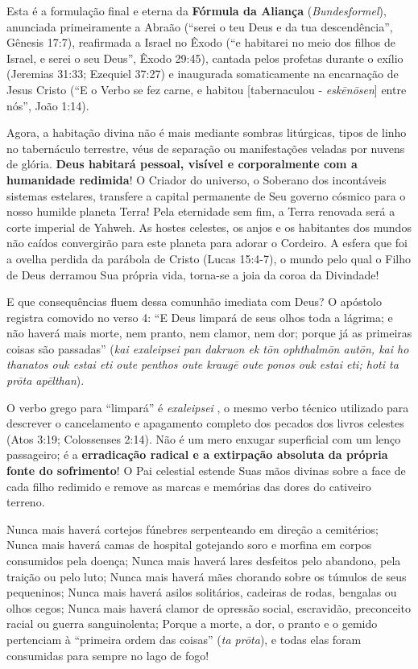 Esta é a formulação final e eterna da \textbf{Fórmula da Aliança} (\textit{Bundesformel}), anunciada primeiramente a Abraão (``serei o teu Deus e da tua descendência'', Gênesis 17:7), reafirmada a Israel no Êxodo (``e habitarei no meio dos filhos de Israel, e serei o seu Deus'', Êxodo 29:45), cantada pelos profetas durante o exílio (Jeremias 31:33; Ezequiel 37:27) e inaugurada somaticamente na encarnação de Jesus Cristo (``E o Verbo se fez carne, e habitou [tabernaculou - \textit{eskēnōsen}] entre nós'', João 1:14).

Agora, a habitação divina não é mais mediante sombras litúrgicas, tipos de linho no tabernáculo terrestre, véus de separação ou manifestações veladas por nuvens de glória. \textbf{Deus habitará pessoal, visível e corporalmente com a humanidade redimida}!
O Criador do universo, o Soberano dos incontáveis sistemas estelares, transfere a capital permanente de Seu governo cósmico para o nosso humilde planeta Terra! Pela eternidade sem fim, a Terra renovada será a corte imperial de Yahweh. As hostes celestes, os anjos e os habitantes dos mundos não caídos convergirão para este planeta para adorar o Cordeiro. A esfera que foi a ovelha perdida da parábola de Cristo (Lucas 15:4-7), o mundo pelo qual o Filho de Deus derramou Sua própria vida, torna-se a joia da coroa da Divindade!

E que consequências fluem dessa comunhão imediata com Deus?
O apóstolo registra comovido no verso 4:
``E Deus limpará de seus olhos toda a lágrima; e não haverá mais morte, nem pranto, nem clamor, nem dor; porque já as primeiras coisas são passadas'' (\textit{kai exaleipsei pan dakruon ek tōn ophthalmōn autōn, kai ho thanatos ouk estai eti oute penthos oute kraugē oute ponos ouk estai eti; hoti ta prōta apēlthan}).

O verbo grego para ``limpará'' é \textit{exaleipsei} , o mesmo verbo técnico utilizado para descrever o cancelamento e apagamento completo dos pecados dos livros celestes (Atos 3:19; Colossenses 2:14). Não é um mero enxugar superficial com um lenço passageiro; é a \textbf{erradicação radical e a extirpação absoluta da própria fonte do sofrimento}!
O Pai celestial estende Suas mãos divinas sobre a face de cada filho redimido e remove as marcas e memórias das dores do cativeiro terreno.

Nunca mais haverá cortejos fúnebres serpenteando em direção a cemitérios;
Nunca mais haverá camas de hospital gotejando soro e morfina em corpos consumidos pela doença;
Nunca mais haverá lares desfeitos pelo abandono, pela traição ou pelo luto;
Nunca mais haverá mães chorando sobre os túmulos de seus pequeninos;
Nunca mais haverá asilos solitários, cadeiras de rodas, bengalas ou olhos cegos;
Nunca mais haverá clamor de opressão social, escravidão, preconceito racial ou guerra sanguinolenta;
Porque a morte, a dor, o pranto e o gemido pertenciam à ``primeira ordem das coisas'' (\textit{ta prōta}), e todas elas foram consumidas para sempre no lago de fogo!



